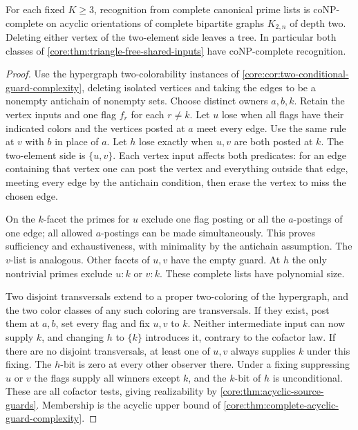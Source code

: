 \begin{corollary}
\label{core:cor:two-by-n-source-hardness}
For each fixed $K\ge3$, recognition from complete canonical prime
lists is coNP-complete on acyclic orientations of complete bipartite
graphs $K_{2,n}$ of depth two. Deleting either vertex of the two-element
side leaves a tree. In particular both classes of
\cref{core:thm:triangle-free-shared-inputs} have coNP-complete recognition.
\end{corollary}
\begin{proof}
Use the hypergraph two-colorability instances of
\cref{core:cor:two-conditional-guard-complexity}, deleting isolated
vertices and taking the edges to be a nonempty antichain of nonempty
sets. Choose distinct owners $a,b,k$. Retain the vertex inputs and
one flag $f_r$ for each $r\ne k$. Let $u$ lose when all flags have
their indicated colors and the vertices posted at $a$ meet every edge.
Use the same rule at $v$ with $b$ in place of $a$. Let $h$ lose
exactly when $u,v$ are both posted at $k$. The two-element side
is $\{u,v\}$. Each vertex input affects both predicates: for an
edge containing that vertex one can post the vertex and everything
outside that edge, meeting every edge by the antichain condition,
then erase the vertex to miss the chosen edge.

On the $k$-facet the primes for $u$ exclude one flag posting or
all the $a$-postings of one edge; all allowed $a$-postings can be
made simultaneously. This proves sufficiency and exhaustiveness,
with minimality by the antichain assumption. The $v$-list is analogous.
Other facets of $u,v$ have the empty guard. At $h$ the only nontrivial
primes exclude $u:k$ or $v:k$. These complete lists have polynomial size.

Two disjoint transversals extend to a proper two-coloring of the
hypergraph, and the two color classes of any such coloring are
transversals. If they exist, post them at $a,b$, set every flag
and fix $u,v$ to $k$. Neither intermediate input can now supply $k$,
and changing $h$ to $\{k\}$ introduces it, contrary to the cofactor
law. If there are no disjoint transversals, at least one of $u,v$
always supplies $k$ under this fixing. The $h$-bit is zero at every
other observer there. Under a fixing suppressing $u$ or $v$ the flags
supply all winners except $k$, and the $k$-bit of $h$ is unconditional.
These are all cofactor tests, giving realizability by
\cref{core:thm:acyclic-source-guards}. Membership is the acyclic upper
bound of \cref{core:thm:complete-acyclic-guard-complexity}.
\end{proof}

